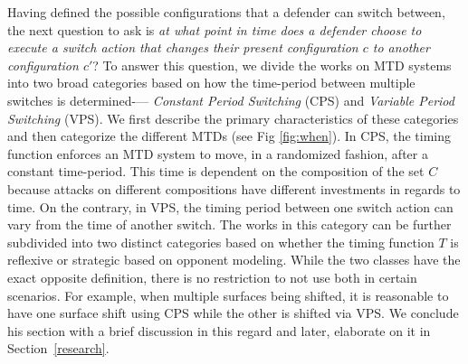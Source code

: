 Having defined the possible configurations that a defender can switch between, the next question to ask is {\em at what point in time does a defender choose to execute a switch action that changes their present configuration $c$ to another configuration $c'$}? To answer this question, we divide the works on MTD systems into two broad categories based on how the time-period between multiple switches is determined-— \emph{Constant Period Switching} (CPS) and \emph{Variable Period Switching} (VPS). We first describe the primary characteristics of these categories and then categorize the different MTDs (see Fig \ref{fig:when}).
In CPS, the timing function enforces an MTD system to move, in a randomized fashion, after a constant time-period. This time is dependent on the composition of the set $C$ because attacks on different compositions have different investments in regards to time. On the contrary, in VPS, the timing period between one switch action can vary from the time of another switch. The works in this category can be further subdivided into two distinct categories based on whether the timing function $T$ is reflexive or strategic based on opponent modeling. While the two classes have the exact opposite definition, there is no restriction to not use both in certain scenarios. For example, when multiple surfaces being shifted, it is reasonable to have one surface shift using CPS while the other is shifted via VPS. We conclude his section with a brief discussion in this regard and later, elaborate on it in Section~\ref{research}.

